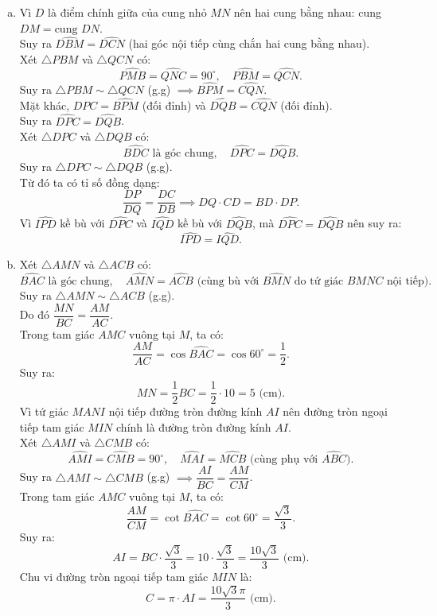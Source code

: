 \begin{bt}
{\begin{enumerate}[a)]
	Xét tứ giác $MANI$ có:
	$$\widehat{AMI} = 90^\circ\text{ (do } CM \perp AB\text{)},\quad \widehat{ANI} = 90^\circ\text{ (do } BN \perp AC\text{)}.$$
	Suy ra $\widehat{AMI} + \widehat{ANI} = 90^\circ + 90^\circ = 180^\circ$.\\
	Vậy $MANI$ là tứ giác nội tiếp đường tròn đường kính $AI$.
	\item Vì $D$ là điểm chính giữa của cung nhỏ $MN$ nên hai cung bằng nhau: cung $DM = \text{cung } DN$.\\
	Suy ra $\widehat{DBM} = \widehat{DCN}$ (hai góc nội tiếp cùng chắn hai cung bằng nhau).\\
	Xét $\triangle PBM$ và $\triangle QCN$ có:
	$$\widehat{PMB} = \widehat{QNC} = 90^\circ,\quad \widehat{PBM} = \widehat{QCN}.$$
	Suy ra $\triangle PBM \sim \triangle QCN$ (g.g) $\implies \widehat{BPM} = \widehat{CQN}$.\\
	Mặt khác, $\widehat{DPC} = \widehat{BPM}$ (đối đỉnh) và $\widehat{DQB} = \widehat{CQN}$ (đối đỉnh).\\
	Suy ra $\widehat{DPC} = \widehat{DQB}$.\\
	Xét $\triangle DPC$ và $\triangle DQB$ có:
	$$\widehat{BDC}\text{ là góc chung},\quad \widehat{DPC} = \widehat{DQB}.$$
	Suy ra $\triangle DPC \sim \triangle DQB$ (g.g).\\
	Từ đó ta có tỉ số đồng dạng:
	$$\dfrac{DP}{DQ} = \dfrac{DC}{DB} \implies DQ \cdot CD = BD \cdot DP.$$
	Vì $\widehat{IPD}$ kề bù với $\widehat{DPC}$ và $\widehat{IQD}$ kề bù với $\widehat{DQB}$, mà $\widehat{DPC} = \widehat{DQB}$ nên suy ra:
	$$\widehat{IPD} = \widehat{IQD}.$$
	\item Xét $\triangle AMN$ và $\triangle ACB$ có:
	$$\widehat{BAC}\text{ là góc chung},\quad \widehat{AMN} = \widehat{ACB}\text{ (cùng bù với }\widehat{BMN}\text{ do tứ giác } BMNC \text{ nội tiếp)}.$$
	Suy ra $\triangle AMN \sim \triangle ACB$ (g.g).\\
	Do đó $\dfrac{MN}{BC} = \dfrac{AM}{AC}$.\\
	Trong tam giác $AMC$ vuông tại $M$, ta có:
	$$\dfrac{AM}{AC} = \cos \widehat{BAC} = \cos 60^\circ = \dfrac{1}{2}.$$
	Suy ra:
	$$MN = \dfrac{1}{2} BC = \dfrac{1}{2} \cdot 10 = 5\text{ (cm)}.$$
	Vì tứ giác $MANI$ nội tiếp đường tròn đường kính $AI$ nên đường tròn ngoại tiếp tam giác $MIN$ chính là đường tròn đường kính $AI$.\\
	Xét $\triangle AMI$ và $\triangle CMB$ có:
	$$\widehat{AMI} = \widehat{CMB} = 90^\circ,\quad \widehat{MAI} = \widehat{MCB}\text{ (cùng phụ với }\widehat{ABC}\text{)}.$$
	Suy ra $\triangle AMI \sim \triangle CMB$ (g.g) $\implies \dfrac{AI}{BC} = \dfrac{AM}{CM}$.\\
	Trong tam giác $AMC$ vuông tại $M$, ta có:
	$$\dfrac{AM}{CM} = \cot \widehat{BAC} = \cot 60^\circ = \dfrac{\sqrt{3}}{3}.$$
	Suy ra:
	$$AI = BC \cdot \dfrac{\sqrt{3}}{3} = 10 \cdot \dfrac{\sqrt{3}}{3} = \dfrac{10\sqrt{3}}{3}\text{ (cm)}.$$
	Chu vi đường tròn ngoại tiếp tam giác $MIN$ là:
	$$C = \pi \cdot AI = \dfrac{10\sqrt{3}\pi}{3}\text{ (cm)}.$$
\end{enumerate}
}
\end{bt}
